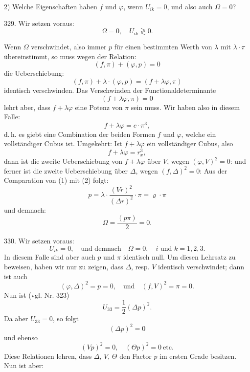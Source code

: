 2) Welche Eigenschaften haben $f$ und $\varphi$, wenn $U_{ik}=0$, und also auch $\Omega=0$?

329.  Wir setzen voraus:
\[
\Omega=0,\quad U_{ik}\gtrless0.
\]


Wenn $\Omega$ verschwindet, also immer $p$ f\"ur einen bestimmten Werth von $\lambda$ mit $\lambda\cdot\pi$ \"ubereinstimmt, so muss wegen der Relation:
\[
(f,\pi)+(\varphi,p)=0
\]
die Ueberschiebung:
\[
(f,\pi)+\lambda\cdot(\varphi,p)=(f+\lambda\varphi,\pi)
\]
identisch verschwinden. Das Verschwinden der Functionaldeterminante
\[
(f+\lambda\varphi,\pi)=0
\]
lehrt aber, dass $f+\lambda\varphi$ eine Potenz von $\pi$ sein muss. Wir haben also in diesem Falle:
\[
f+\lambda\varphi = c\cdot\pi^3,
\]
d.\,h. es giebt eine Combination der beiden Formen $f$ und $\varphi$, welche ein vollst\"andiger Cubus ist. Umgekehrt: Ist $f+\lambda\varphi$ ein vollst\"andiger Cubus, also
\[
f+\lambda\varphi = r_x^3,
\]
dann ist die zweite Ueberschiebung von $f+\lambda\varphi$ \"uber $V$, wegen $(\varphi,V)^2=0$:
und ferner ist die zweite Ueberschiebung \"uber $\Delta$, wegen $(f,\Delta)^2=0$:
Aus der Comparation von (1) mit (2) folgt:
\[
p = \lambda\cdot\frac{(Vr)^2}{(\Delta r)^2}\cdot\pi = \varrho\cdot\pi
\]
und demnach:
\[
\Omega = \frac{(p\pi)}{2} = 0.
\]

330.  Wir setzen voraus:
\[
U_{ik}=0,\quad\text{und demnach}\quad \Omega=0,\quad i\text{ und }k=1,2,3.
\]
In diesem Falle sind aber auch $p$ und $\pi$ identisch null. Um diesen Lehrsatz zu beweisen, haben wir nur zu zeigen, dass $\Delta$, resp. $V$ identisch verschwindet; dann ist auch
\[
(\varphi,\Delta)^2 = p = 0,\quad\text{und}\quad (f,V)^2 = \pi = 0.
\]
Nun ist (vgl. Nr. 323)
\[
U_{33} = \frac{1}{2}(\Delta p)^2.
\]
Da aber $U_{33}=0$, so folgt
\[
(\Delta p)^2 = 0
\]
und ebenso
\[
(Vp)^2 = 0,\quad (\Theta p)^2 = 0\ \text{etc.}
\]
Diese Relationen lehren, dass $\Delta$, $V$, $\Theta$ den Factor $p$ im ersten Grade besitzen. Nun ist aber:


